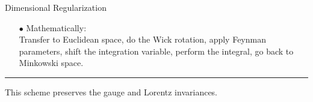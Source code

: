 \documentclass[aspectratio=169,usenames,dvipsnames]{beamer}
\begin{document}
\begin{frame}[t]{Dimensional Regularization}
\begin{itemize}
\begin{align*}
     \int \frac{d^4 p}{(2\pi)^4} \qquad  &\rightarrow \qquad  \int \frac{(\mu)^{2\epsilon} \; d^d p}{(2\pi)^d}
    \end{align*}
    \scriptsize Where $\mu$ is a regulator parameter of dimensional regularization with dimension $[\mu]=M^{\epsilon}$.
    \small\item[$\bullet$] Mathematically:\\
    Transfer to Euclidean space, do the Wick rotation, apply Feynman parameters, shift the integration variable, perform the integral, go back to Minkowski space.
  \end{itemize}\vspace{2mm}
\textcolor{LUCopper}{\rule{\textwidth}{1pt}}
\tiny{This scheme preserves the gauge and Lorentz invariances.}
\end{frame}
\end{document}
